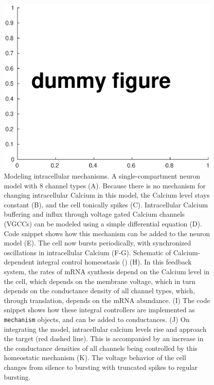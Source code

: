 \documentclass{frontiersSCNS} %
\begin{document}
\begin{figure}[!htb]
	\centering
	\includegraphics[width=1.0\linewidth]{gfx/figure_mechanism}
	\caption{Modeling intracellular mechanisms. A single-compartment neuron model with 8 channel types (A). Because there is no mechanism for changing intracellular Calcium in this model, the Calcium level stays constant (B), and the cell tonically spikes (C). Intracellular Calcium buffering and influx through voltage gated Calcium channels (VGCCs) can be modeled using a simple differential equation (D). Code snippet shows how this mechanism can be added to the neuron model (E). The cell now bursts periodically, with synchronized oscillations in intracellular Calcium (F-G). Schematic of Calcium-dependent integral control homeostasis (\cite{olearyCorrelationsIonChannel2013, olearyCellTypesNetwork2014}) (H). In this feedback system, the rates of mRNA synthesis depend on the Calcium level in the cell, which depends on the membrane voltage, which in turn depends on the conductance density of all channel types, which, through translation, depends on the mRNA abundance. (I) The code snippet shows how these integral controllers are implemented as \texttt{mechanism} objects, and can be added to conductances. (J) On integrating the model, intracellular calcium levels rise and approach the target (red dashed line). This is accompanied by an increase in the conductance densities of all channels being controlled by this homeostatic mechanism (K). The voltage behavior of the cell changes from silence to bursting with truncated spikes to regular bursting.}
	\label{fig:figuremechanism}
\end{figure}
\end{document}
